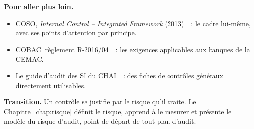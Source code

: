 \bigskip

\begin{boxinfo}
\textbf{Pour aller plus loin.}
\begin{itemize}
    \item COSO, \textit{Internal Control -- Integrated Framework}
          (2013)~\cite{coso2013ic}~: le cadre lui-même, avec ses points
          d'attention par principe.
    \item COBAC, règlement R-2016/04~\cite{cobac2016r04}~: les exigences
          applicables aux banques de la CEMAC.
    \item Le guide d'audit des SI du CHAI~\cite{chai2014guide}~: des
          fiches de contrôles généraux directement utilisables.
\end{itemize}
\end{boxinfo}

\begin{boxinfo}
\textbf{Transition.} Un contrôle se justifie par le risque qu'il traite. Le
Chapitre~\ref{chap:risque} définit le risque, apprend à le mesurer et
présente le modèle du risque d'audit, point de départ de tout plan
d'audit.
\end{boxinfo}
